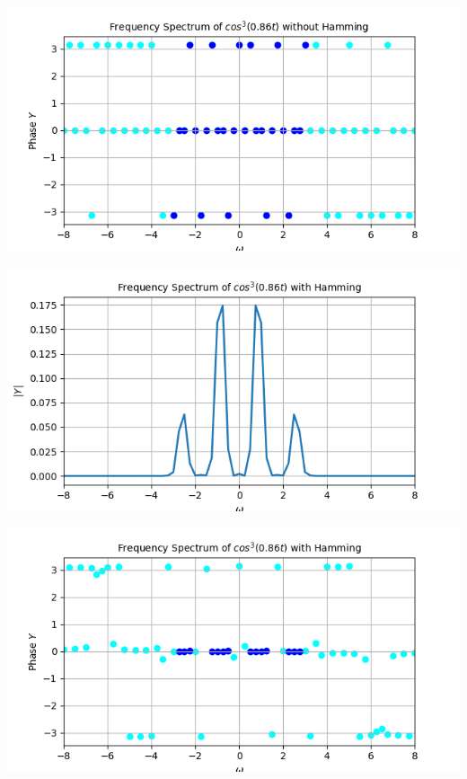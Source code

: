 \documentclass[12pt, a4paper]{report}
\begin{document}
\begin{center}
	\includegraphics[scale=0.75]{Figure_11.png} 
	\label{fig:rawdata}
\end{center}
\begin{center}
	\includegraphics[scale=0.75]{Figure_12.png} 
	\label{fig:rawdata}
\end{center}
\begin{center}
	\includegraphics[scale=0.75]{Figure_13.png} 
	\label{fig:rawdata}
\end{center}
\clearpage
\end{document}

